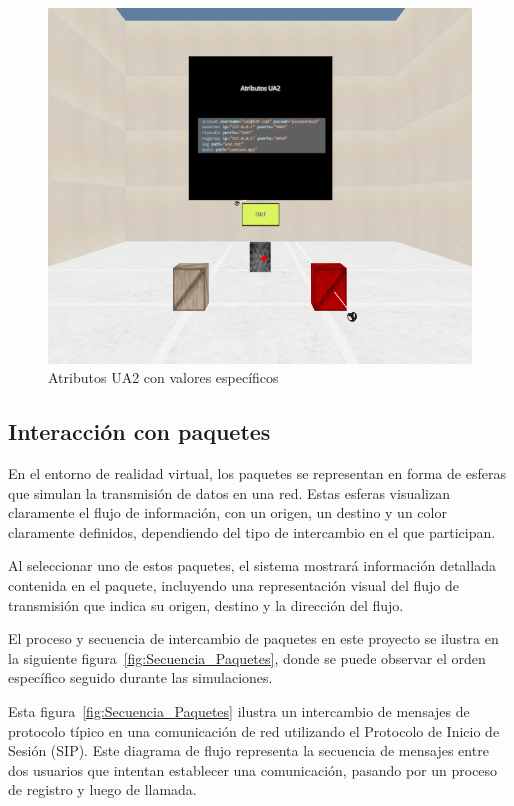 \documentclass[a4paper, 12pt]{book}
\begin{document}
\begin{figure}
  \centering
  \includegraphics[width=15cm, keepaspectratio]{img/resultados/UA2_Iniciado.png}
  \caption{Atributos UA2 con valores específicos}
  \label{fig:UA2_Iniciado}
\end{figure}


\subsection{Interacción con paquetes}
\label{subsec:objeto_paquetes}
En el entorno de realidad virtual, los paquetes se representan en forma de esferas que simulan la transmisión de datos en una red. 
Estas esferas visualizan claramente el flujo de información, con un origen, un destino y un color claramente definidos, 
dependiendo del tipo de intercambio en el que participan.

Al seleccionar uno de estos paquetes, el sistema mostrará información detallada contenida en el paquete, 
incluyendo una representación visual del flujo de transmisión que indica su origen, destino y la dirección del flujo.

El proceso y secuencia de intercambio de paquetes en este proyecto se ilustra en la siguiente figura~\ref{fig:Secuencia_Paquetes}, donde se puede observar el orden 
específico seguido durante las simulaciones.

Esta figura~\ref{fig:Secuencia_Paquetes} ilustra un intercambio de mensajes de protocolo típico en una comunicación de red utilizando el Protocolo de Inicio de Sesión (SIP). 
Este diagrama de flujo representa la secuencia de mensajes entre dos usuarios que intentan establecer una comunicación, 
pasando por un proceso de registro y luego de llamada.
\end{document}

